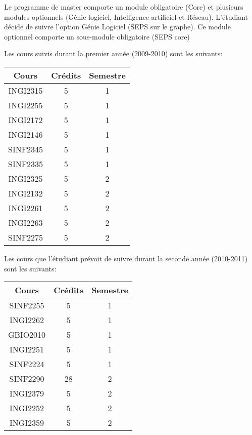 Le programme de master comporte un module obligatoire (Core) et plusieurs modules optionnels (Génie logiciel, Intelligence artificiel et Réseau). L'étudiant décide de suivre l'option Génie Logiciel (SEPS sur le graphe). Ce module optionnel comporte un sous-module obligatoire (SEPS core)

Les cours suivis durant la premier année (2009-2010) sont les suivants:

\begin{table}[H]
\centering
\begin{tabular}{|c|c|c|}
\hline
\textbf{Cours} & \textbf{Crédits} & \textbf{Semestre}\\
\hline
INGI2315 & 5 & 1 \\
\hline
INGI2255 & 5 & 1 \\
\hline
INGI2172 & 5 & 1 \\
\hline
INGI2146 & 5 & 1 \\
\hline
SINF2345 & 5 & 1 \\
\hline
SINF2335 & 5 & 1 \\
\hline
INGI2325 & 5 & 2 \\
\hline
INGI2132 & 5 & 2 \\
\hline
INGI2261 & 5 & 2 \\
\hline
INGI2263 & 5 & 2 \\
\hline
SINF2275 & 5 & 2\\
\hline
\end{tabular}
\end{table}

Les cours que l'étudiant prévoit de suivre durant la seconde année (2010-2011) sont les suivants:

\begin{table}[H]
\centering
\begin{tabular}{|c|c|c|}
\hline
\textbf{Cours} & \textbf{Crédits} & \textbf{Semestre}\\
\hline
SINF2255 & 5 & 1\\
\hline
INGI2262 & 5 & 1\\
\hline
GBIO2010 & 5 & 1\\
\hline
INGI2251 & 5 & 1\\
\hline
SINF2224 & 5 & 1\\
\hline
SINF2290 &28 & 2 \\
\hline
INGI2379 & 5 & 2\\
\hline
INGI2252 & 5 & 2\\
\hline
INGI2359 & 5 & 2\\
\hline
\end{tabular}
\end{table}




